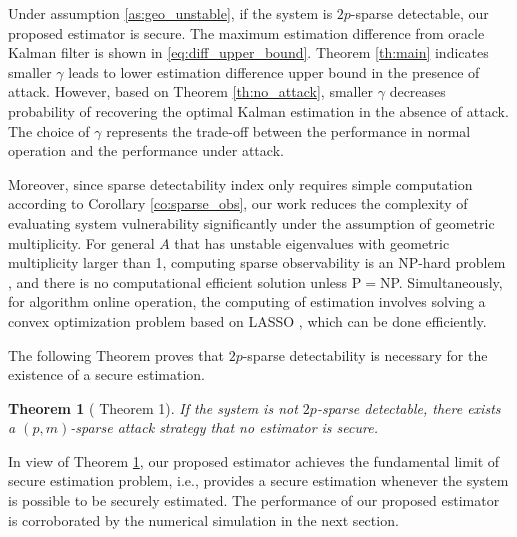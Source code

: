 \documentclass[12pt]{article}  %
\newtheorem{theorem}{\textbf{Theorem}}
\newtheorem{remark}{\textbf{Remark}}
\begin{document}
Under assumption \ref{as:geo_unstable}, if the system is $2p$-sparse detectable, our proposed estimator is secure. The maximum estimation difference from oracle Kalman filter is shown in \eqref{eq:diff_upper_bound}.
Theorem \ref{th:main} indicates smaller $\gamma$ leads to lower estimation difference upper bound in the presence of attack. However, based on Theorem \ref{th:no_attack}, smaller $\gamma$ decreases probability of recovering the optimal Kalman estimation in the absence of attack. The choice of $\gamma$ represents the trade-off between the performance in normal operation and the performance under attack. 

Moreover, since sparse detectability index only requires simple computation according to Corollary \ref{co:sparse_obs}, our work reduces the complexity of evaluating system vulnerability significantly under the assumption of geometric multiplicity.
For general $A$ that has unstable eigenvalues with geometric multiplicity larger than 1, computing sparse observability is an NP-hard problem \cite{yanwen_CDC19}\cite{sandberg_TAC2014}, and there is no computational efficient solution unless P$=$NP. Simultaneously, for algorithm online operation, the computing of estimation involves solving a convex optimization problem based on LASSO \cite{LASSOTibshirani}, which can be done efficiently.
	
%		
	
The following Theorem proves that $2p$-sparse detectability is necessary for the existence of a secure estimation.
\begin{theorem}[\hspace{-0.001pt}\cite{yorie} Theorem 1]\label{th:funda_lim}
	If the system is not $2p$-sparse detectable, there exists a $(p,m)$-sparse attack strategy that no estimator is secure.
\end{theorem}
In view of Theorem \ref{th:funda_lim}, our proposed estimator achieves the fundamental limit of secure estimation problem, i.e., provides a secure estimation whenever the system is possible to be securely estimated. 
The performance of our proposed estimator is corroborated by the numerical simulation in the next section.
\end{document}
